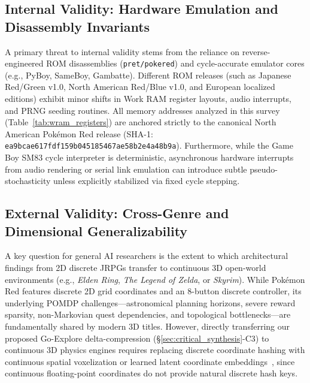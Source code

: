 \documentclass[journal,10pt,twocolumn]{IEEEtran}
\begin{document}
\subsection{Internal Validity: Hardware Emulation and Disassembly Invariants}
A primary threat to internal validity stems from the reliance on reverse-engineered ROM disassemblies (\texttt{pret/pokered}) and cycle-accurate emulator cores (e.g., PyBoy, SameBoy, Gambatte). Different ROM releases (such as Japanese Red/Green v1.0, North American Red/Blue v1.0, and European localized editions) exhibit minor shifts in Work RAM register layouts, audio interrupts, and PRNG seeding routines. All memory addresses analyzed in this survey (Table~\ref{tab:wram_registers}) are anchored strictly to the canonical North American Pok{\'e}mon Red release (SHA-1: \texttt{ea9bcae617fdf159b045185467ae58b2e4a48b9a}). Furthermore, while the Game Boy SM83 cycle interpreter is deterministic, asynchronous hardware interrupts from audio rendering or serial link emulation can introduce subtle pseudo-stochasticity unless explicitly stabilized via fixed cycle stepping.

\subsection{External Validity: Cross-Genre and Dimensional Generalizability}
A key question for general AI researchers is the extent to which architectural findings from 2D discrete JRPGs transfer to continuous 3D open-world environments (e.g., \textit{Elden Ring}, \textit{The Legend of Zelda}, or \textit{Skyrim}). While Pok{\'e}mon Red features discrete 2D grid coordinates and an 8-button discrete controller, its underlying POMDP challenges---astronomical planning horizons, severe reward sparsity, non-Markovian quest dependencies, and topological bottlenecks---are fundamentally shared by modern 3D titles. However, directly transferring our proposed Go-Explore delta-compression (\S\ref{sec:critical_synthesis}-C3) to continuous 3D physics engines requires replacing discrete coordinate hashing with continuous spatial voxelization or learned latent coordinate embeddings~\cite{ecoffet2021goexplore}, since continuous floating-point coordinates do not provide natural discrete hash keys.
\end{document}
